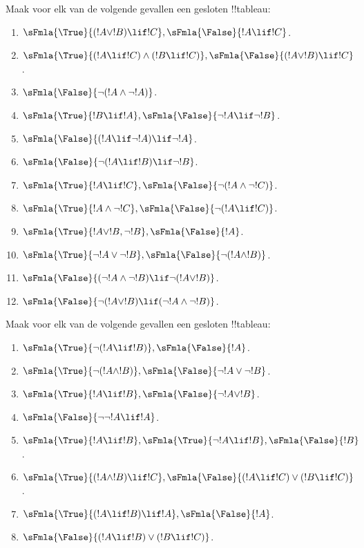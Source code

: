 \documentclass[../../../include/open-logic-section]{subfiles}
\begin{document}
\begin{prob}
Maak voor elk van de volgende gevallen een gesloten !!{tableau}:
\begin{enumerate}
\item $\sFmla{\True}{(!A \lor !B) \lif !C}, \sFmla{\False}{!A \lif !C}$.
\item $\sFmla{\True}{(!A \lif !C) \land (!B \lif !C)}, \sFmla{\False}{(!A \lor !B) \lif !C}$.
\item $\sFmla{\False}{\lnot(!A \land \lnot !A)}$.
\item $\sFmla{\True}{!B \lif !A}, \sFmla{\False}{\lnot !A \lif \lnot !B}$.
\item $\sFmla{\False}{(!A \lif \lnot !A) \lif \lnot !A}$.
\item $\sFmla{\False}{\lnot(!A \lif !B) \lif \lnot !B}$.
\item $\sFmla{\True}{!A \lif !C}, \sFmla{\False}{\lnot (!A \land \lnot !C)}$.
\item $\sFmla{\True}{!A \land \lnot !C}, \sFmla{\False}{\lnot (!A \lif !C)}$.
\item $\sFmla{\True}{!A \lor !B, \lnot !B}, \sFmla{\False}{!A}$.
\item $\sFmla{\True}{\lnot !A \lor \lnot !B}, \sFmla{\False}{\lnot(!A \land !B)}$.
\item $\sFmla{\False}{(\lnot !A \land \lnot !B) \lif\lnot(!A \lor !B)}$.
\item $\sFmla{\False}{\lnot(!A \lor !B) \lif (\lnot !A \land \lnot !B)}$.
\end{enumerate}
\end{prob}

\begin{prob}
Maak voor elk van de volgende gevallen een gesloten !!{tableau}:
\begin{enumerate}
\item $\sFmla{\True}{\lnot(!A \lif !B)}, \sFmla{\False}{!A}$.
\item $\sFmla{\True}{\lnot(!A \land !B)}, \sFmla{\False}{\lnot !A \lor \lnot !B}$.
\item $\sFmla{\True}{!A \lif !B}, \sFmla{\False}{\lnot !A \lor !B}$.
\item $\sFmla{\False}{\lnot \lnot !A \lif !A}$.
\item $\sFmla{\True}{!A \lif !B}, \sFmla{\True}{\lnot !A \lif !B}, \sFmla{\False}{!B}$.
\item $\sFmla{\True}{(!A \land !B) \lif !C}, \sFmla{\False}{(!A \lif !C) \lor (!B \lif !C)}$.
\item $\sFmla{\True}{(!A \lif !B) \lif !A}, \sFmla{\False}{!A}$.
\item $\sFmla{\False}{(!A \lif !B) \lor (!B \lif !C)}$.
\end{enumerate}
\end{prob}
\end{document}
